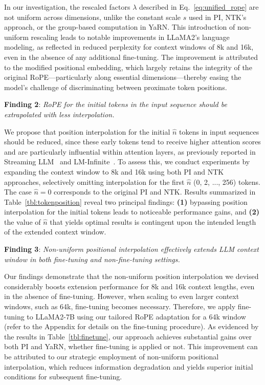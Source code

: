 In our investigation, the rescaled factors $\lambda$ described in Eq.~\ref{eq:unified_rope} are not uniform across dimensions, unlike the constant scale $s$ used in PI, NTK’s approach, or the group-based computation in YaRN. This introduction of non-uniform rescaling leads to notable improvements in LLaMA2’s language modeling, as reflected in reduced perplexity for context windows of 8k and 16k, even in the absence of any additional fine-tuning. The improvement is attributed to the modified positional embedding, which largely retains the integrity of the original RoPE—particularly along essential dimensions—thereby easing the model’s challenge of discriminating between proximate token positions.

\textbf{Finding 2}: \textit{RoPE for the initial tokens in the input sequence should be extrapolated with less interpolation.} 

We propose that position interpolation for the initial $\hat{n}$ tokens in input sequences should be reduced, since these early tokens tend to receive higher attention scores and are particularly influential within attention layers, as previously reported in Streaming LLM~\cite{streamingllm} and LM-Infinite~\cite{han2023lminfinite}. To assess this, we conduct experiments by expanding the context window to 8k and 16k using both PI and NTK approaches, selectively omitting interpolation for the first $\hat n$ (0, 2, ..., 256) tokens. The case $\hat n=0$ corresponds to the original PI and NTK. Results summarized in Table~\ref{tbl:tokenposition} reveal two principal findings: \textbf{(1)} bypassing position interpolation for the initial tokens leads to noticeable performance gains, and \textbf{(2)} the value of $\hat n$ that yields optimal results is contingent upon the intended length of the extended context window.

\textbf{Finding 3}: \textit{Non-uniform positional interpolation effectively extends LLM context window in both fine-tuning and non-fine-tuning settings.} 

Our findings demonstrate that the non-uniform position interpolation we devised considerably boosts extension performance for 8k and 16k context lengths, even in the absence of fine-tuning. However, when scaling to even larger context windows, such as 64k, fine-tuning becomes necessary. Therefore, we apply fine-tuning to LLaMA2-7B using our tailored RoPE adaptation for a 64k window (refer to the Appendix for details on the fine-tuning procedure). As evidenced by the results in Table~\ref{tbl:finetune}, our approach achieves substantial gains over both PI and YaRN, whether fine-tuning is applied or not. This improvement can be attributed to our strategic employment of non-uniform positional interpolation, which reduces information degradation and yields superior initial conditions for subsequent fine-tuning.

